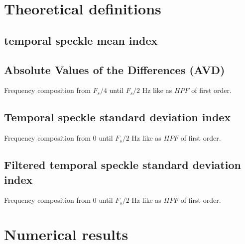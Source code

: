 \documentclass[review]{elsarticle}
\begin{document}
\section{Theoretical definitions}
\label{sec:theoretical}

\subsection{temporal speckle mean index}
\label{sec:mean}

\subsection{Absolute Values of the Differences (AVD)}
\label{sec:avd}


Frequency composition from $F_s/4$ until $F_s/2$ Hz like as  $HPF$ of first order.


\subsection{Temporal speckle standard deviation index}
\label{sec:std}
Frequency composition from $0$ until $F_s/2$ Hz like as  $HPF$ of first order.

\subsection{Filtered temporal speckle standard deviation index}
\label{sec:stdf}
Frequency composition from $0$ until $F_s/2$ Hz like as  $HPF$ of first order.


\section{Numerical results} 
\label{sec:numericalresults}
\end{document}
